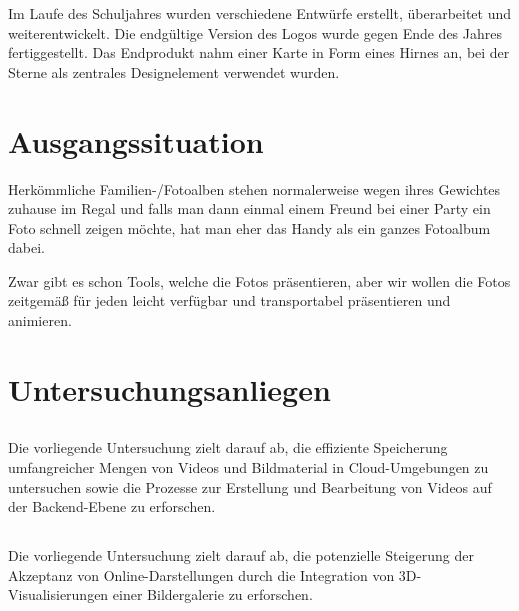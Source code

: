 Im Laufe des Schuljahres wurden verschiedene Entwürfe erstellt, überarbeitet und 
weiterentwickelt. Die endgültige Version des Logos wurde gegen Ende des Jahres 
fertiggestellt. Das Endprodukt nahm einer Karte in Form eines Hirnes an, bei der 
Sterne als zentrales Designelement verwendet wurden.

\newpage

\section{Ausgangssituation}

Herkömmliche Familien-/Fotoalben stehen normalerweise wegen ihres Gewichtes 
zuhause im Regal und falls man dann einmal einem Freund bei einer Party ein Foto schnell 
zeigen möchte, hat man eher das Handy als ein ganzes Fotoalbum dabei.

Zwar gibt es schon Tools, welche die Fotos präsentieren, aber wir wollen die Fotos 
zeitgemä\ss{} für jeden leicht verfügbar und transportabel präsentieren und animieren.

\section{Untersuchungsanliegen}

\subsection{\firstauthor}

Die vorliegende Untersuchung zielt darauf ab, die effiziente Speicherung 
umfangreicher Mengen von Videos und Bildmaterial in Cloud-Umgebungen zu 
untersuchen sowie die Prozesse zur Erstellung und Bearbeitung von Videos 
auf der Backend-Ebene zu erforschen.

\subsection{\secondauthor}

Die vorliegende Untersuchung zielt darauf ab, die potenzielle Steigerung 
der Akzeptanz von Online-Darstellungen durch die Integration von 
3D-Visualisierungen einer Bildergalerie zu erforschen.

